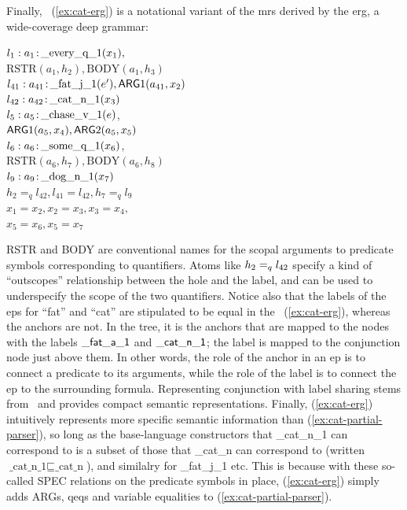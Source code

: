 Finally, \rmrs\ (\ref{ex:cat-erg}) is a notational variant of the {\sc
  mrs} derived by the {\sc erg}, a wide-coverage deep grammar:
\begin{examples}
\item $l_1:a_1\colon\!\mbox{\_every\_q\_1}(x_1),$\\
\hspace*{0.1in}$\mbox{RSTR}(a_1,h_2),
\mbox{BODY}(a_1,h_3)$\\ 
$l_{41}:a_{41}\colon\!\mbox{\_fat\_j\_1}(e'), \mathsf{ARG}1(a_{41},x_2)$\\
$l_{42}:a_{42}\colon\!\mbox{\_cat\_n\_1}(x_3)$\\
$l_5:a_5\colon\!\mbox{\_chase\_v\_1}(e)$,\\
\hspace*{0.1in}$\mathsf{ARG}1(a_5,x_4),
\mathsf{ARG}2(a_5,x_5)$\\ 
$l_6:a_6\colon\!\mbox{\_some\_q\_1}(x_6)$,\\
\hspace*{0.1in}$\mbox{RSTR}(a_6,h_7),
\mbox{BODY}(a_6,h_8)$\\ 
$l_9:a_9\colon\!\mbox{\_dog\_n\_1}(x_7)$\\
$h_2=_q l_{42}, l_{41}=l_{42}, h_7 =_q l_9$\\
$x_1=x_2, x_2=x_3, x_3=x_4,$\\
$x_5=x_6, x_5=x_7$
\label{ex:cat-erg}
\end{examples}
RSTR and BODY are conventional names for the scopal arguments to
predicate symbols corresponding to quantifiers.   
Atoms like $h_2 =_q l_{42}$ specify
a kind of ``outscopes'' relationship between the hole and the label,
and can be used to underspecify the scope of the two quantifiers.
Notice also that the labels of the {\sc ep}s for ``fat'' and ``cat'' are
stipulated to be equal in the \rmrs\ (\ref{ex:cat-erg}), whereas the
anchors are not. 
In the tree, it is the anchors that are mapped to the nodes with the
labels $\mathsf{\_fat\_a\_1}$ and $\mathsf{\_cat\_n\_1}$; the label is
mapped to the conjunction node just above them.  In other words, the
role of the anchor in an {\sc ep} is to connect a predicate to its
arguments, while the role of the label is to connect the {\sc ep} to the
surrounding formula.  Representing conjunction with label sharing
stems from \mrs\ and provides compact semantic representations.
Finally, (\ref{ex:cat-erg}) intuitively represents more specific
semantic information than (\ref{ex:cat-partial-parser}), so long as
the base-language constructors that \_cat\_n\_1 can correspond to is a
subset of those that \_cat\_n can correspond to (written
$\mbox{\_cat\_n\_1}\sqsubseteq \mbox{\_cat\_n}$), and similalry for
\_fat\_j\_1 etc.  This is because with these so-called SPEC relations
on the predicate symbols in place, (\ref{ex:cat-erg}) simply adds
ARGs, qeqs and variable equalities to (\ref{ex:cat-partial-parser}).

